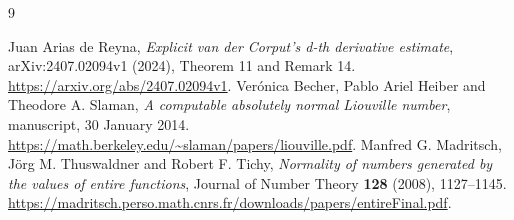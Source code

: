 \documentclass[11pt,a4paper]{article}
\begin{document}
\begin{thebibliography}{9}
 Juan Arias de Reyna, \emph{Explicit van der Corput's d-th derivative estimate}, arXiv:2407.02094v1 (2024), Theorem 11 and Remark 14. \url{https://arxiv.org/abs/2407.02094v1}.
 Ver\'onica Becher, Pablo Ariel Heiber and Theodore A. Slaman, \emph{A computable absolutely normal Liouville number}, manuscript, 30 January 2014. \url{https://math.berkeley.edu/~slaman/papers/liouville.pdf}.
 Manfred G. Madritsch, J\"org M. Thuswaldner and Robert F. Tichy, \emph{Normality of numbers generated by the values of entire functions}, Journal of Number Theory \textbf{128} (2008), 1127--1145. \url{https://madritsch.perso.math.cnrs.fr/downloads/papers/entireFinal.pdf}.
\end{thebibliography}
\end{document}
